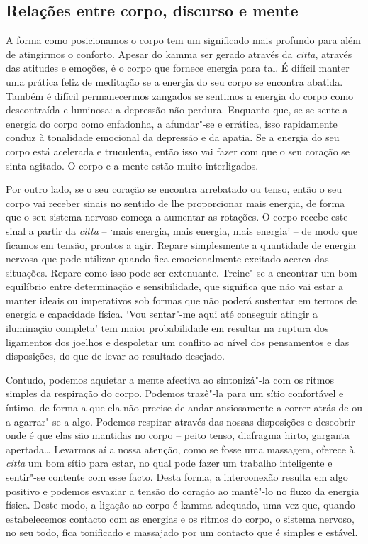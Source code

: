 \subsection{Relações entre corpo, discurso e mente}

\enlargethispage{\baselineskip}

A forma como posicionamos o corpo tem um significado mais profundo para além de
atingirmos o conforto. Apesar do kamma ser gerado através da \emph{citta},
através das atitudes e emoções, é o corpo que fornece energia para tal. É
difícil manter uma prática feliz de meditação se a energia do seu corpo se
encontra abatida. Também é difícil permanecermos zangados se sentimos a energia
do corpo como descontraída e luminosa: a depressão não perdura. Enquanto que, se
se sente a energia do corpo como enfadonha, a afundar"-se e errática, isso
rapidamente conduz à tonalidade emocional da depressão e da apatia. Se a energia
do seu corpo está acelerada e truculenta, então isso vai fazer com que o seu
coração se sinta agitado. O corpo e a mente estão muito interligados.

Por outro lado, se o seu coração se encontra arrebatado ou tenso, então o seu
corpo vai receber sinais no sentido de lhe proporcionar mais energia, de forma
que o seu sistema nervoso começa a aumentar as rotações. O corpo recebe este
sinal a partir da \emph{citta} -- `mais energia, mais energia, mais energia' --
de modo que ficamos em tensão, prontos a agir. Repare simplesmente a quantidade
de energia nervosa que pode utilizar quando fica emocionalmente excitado acerca
das situações. Repare como isso pode ser extenuante. Treine"-se a encontrar um
bom equilíbrio entre determinação e sensibilidade, que significa que não vai
estar a manter ideais ou imperativos sob formas que não poderá sustentar em
termos de energia e capacidade física. `Vou sentar"-me aqui até conseguir atingir
a iluminação completa' tem maior probabilidade em resultar na ruptura dos
ligamentos dos joelhos e despoletar um conflito ao nível dos pensamentos e das
disposições, do que de levar ao resultado desejado.

Contudo, podemos aquietar a mente afectiva ao sintonizá"-la com os ritmos simples
da respiração do corpo. Podemos trazê"-la para um sítio confortável e íntimo, de
forma a que ela não precise de andar ansiosamente a correr atrás de ou a
agarrar"-se a algo. Podemos respirar através das nossas disposições e descobrir
onde é que elas são mantidas no corpo -- peito tenso, diafragma hirto, garganta
apertada\ldots{} Levarmos aí a nossa atenção, como se fosse uma massagem,
oferece à \emph{citta} um bom sítio para estar, no qual pode fazer um trabalho
inteligente e sentir"-se contente com esse facto. Desta forma, a interconexão
resulta em algo positivo e podemos esvaziar a tensão do coração ao mantê"-lo no
fluxo da energia física. Deste modo, a ligação ao corpo é kamma adequado, uma
vez que, quando estabelecemos contacto com as energias e os ritmos do corpo, o
sistema nervoso, no seu todo, fica tonificado e massajado por um contacto que é
simples e estável.

